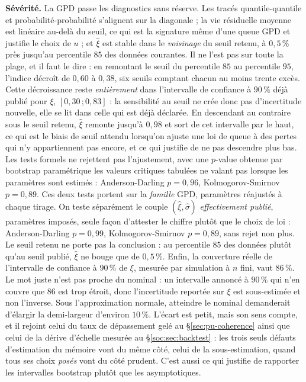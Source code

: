 \textbf{Sévérité.} La GPD passe les diagnostics sans réserve. Les tracés quantile-quantile et
probabilité-probabilité s'alignent sur la diagonale ; la vie résiduelle moyenne est linéaire
au-delà du seuil, ce qui est la signature même d'une queue GPD et justifie le choix de $u$ ;
et $\hat\xi$ est stable dans le \emph{voisinage} du seuil retenu, à $0{,}5\,\%$ près jusqu'au
percentile $85$ des données courantes. Il ne l'est pas sur toute la plage, et il faut le dire :
en remontant le seuil du percentile $85$ au percentile $95$, l'indice décroît de $0{,}60$ à
$0{,}38$, six seuils comptant chacun au moins trente excès. Cette décroissance reste
\emph{entièrement} dans l'intervalle de confiance à $90\,\%$ déjà publié pour $\xi$,
$[0{,}30\,;0{,}83]$ : la sensibilité au seuil ne crée donc pas d'incertitude nouvelle, elle se
lit dans celle qui est déjà déclarée. En descendant au contraire sous le seuil retenu, $\hat\xi$
remonte jusqu'à $0{,}98$ et sort de cet intervalle par le haut, ce qui est le biais de seuil
attendu lorsqu'on ajuste une loi de queue à des pertes qui n'y appartiennent pas encore, et ce
qui justifie de ne pas descendre plus bas. Les tests formels
ne rejettent pas l'ajustement, avec une $p$-value obtenue par bootstrap paramétrique
les valeurs critiques tabulées ne valant pas lorsque les paramètres sont estimés :
Anderson-Darling $p=0{,}96$, Kolmogorov-Smirnov $p=0{,}89$. Ces deux tests portent sur la
\emph{famille} GPD, paramètres réajustés à chaque tirage. On teste séparément le couple
$(\hat\xi,\hat\sigma)$ \emph{effectivement publié}, paramètres imposés, seule façon d'attester
le chiffre plutôt que le choix de loi : Anderson-Darling $p=0{,}99$, Kolmogorov-Smirnov
$p=0{,}89$, sans rejet non plus. Le seuil retenu ne porte pas la conclusion : au percentile
$85$ des données plutôt qu'au seuil publié, $\hat\xi$ ne bouge que de $0{,}5\,\%$. Enfin,
la couverture réelle
de l'intervalle de confiance à $90\,\%$ de $\xi$, mesurée par simulation à $n$ fini, vaut
$86\,\%$. Le mot juste n'est pas \og{}proche du nominal\fg{} : un intervalle annoncé à
$90\,\%$ qui n'en couvre que $86$ est trop étroit, donc l'incertitude reportée sur
$\xi$ est sous-estimée et non l'inverse. Sous l'approximation normale, atteindre le nominal
demanderait d'élargir la demi-largeur d'environ $10\,\%$. L'écart est petit, mais son sens
compte, et il rejoint celui du taux de dépassement gelé au \S\ref{sec:pu-coherence} ainsi que
celui de la dérive d'échelle mesurée au \S\ref{soc:sec:backtest} : les trois seuls défauts
d'estimation du mémoire vont du même côté, celui de la sous-estimation, quand tous ses choix
\emph{posés} vont du côté prudent. C'est aussi ce qui justifie de rapporter les
intervalles bootstrap plutôt que les asymptotiques.

